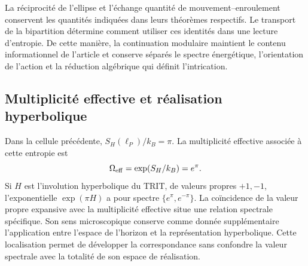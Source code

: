 La réciprocité de l’ellipse et l’échange quantité de mouvement--enroulement
conservent les quantités indiquées dans leurs théorèmes respectifs. Le
transport de la bipartition détermine comment utiliser ces identités
dans une lecture d’entropie. De cette manière, la continuation modulaire
maintient le contenu informationnel de l’article et conserve séparés
le spectre énergétique, l’orientation de l’action et la réduction
algébrique qui définit l’intrication.

\subsection{Multiplicité effective et réalisation hyperbolique}

Dans la cellule précédente, \(S_H(\ell_P)/k_B=\pi\). La multiplicité
effective associée à cette entropie est
\[
 \Omega_{\rm eff}=\exp(S_H/k_B)=e^\pi.
\]
Si \(H\) est l’involution hyperbolique du TRIT, de valeurs propres
\(+1,-1\), l’exponentielle \(\exp(\pi H)\) a pour spectre
\(\{e^\pi,e^{-\pi}\}\). La coïncidence de la valeur propre expansive
avec la multiplicité effective situe une relation spectrale spécifique.
Son sens microscopique conserve comme donnée supplémentaire l’application entre
l’espace de l’horizon et la représentation hyperbolique. Cette
localisation permet de développer la correspondance sans confondre
la valeur spectrale avec la totalité de son espace de réalisation.

